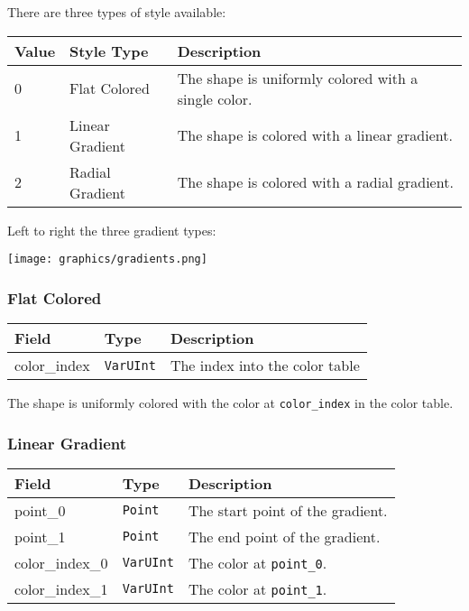 \documentclass[]{article}
\begin{document}
There are three types of style available:

\begin{longtable}[]{@{}p{0.5in}p{1in}p{4.5in}@{}}
\toprule
Value & Style Type & Description \\
\midrule
\endhead
0 & Flat Colored & The shape is uniformly colored with a single
color. \\
1 & Linear Gradient & The shape is colored with a linear gradient. \\
2 & Radial Gradient & The shape is colored with a radial gradient. \\
\bottomrule
\end{longtable}

Left to right the three gradient types:

\begin{center}
\texttt{[image: graphics/gradients.png]}
\end{center}

\hypertarget{flat-colored}{\subsubsection{Flat Colored}\label{flat-colored}}

\begin{longtable}[]{@{}p{1in}p{1in}p{4in}@{}}
\toprule
Field & Type & Description \\
\midrule
\endhead
color\_index & \texttt{VarUInt} & The index into the color table \\
\bottomrule
\end{longtable}

The shape is uniformly colored with the color at \texttt{color\_index}
in the color table.

\hypertarget{linear-gradient}{\subsubsection{Linear Gradient}\label{linear-gradient}}

\begin{longtable}[]{@{}p{1in}p{1in}p{4in}@{}}
\toprule
Field & Type & Description \\
\midrule
\endhead
point\_0        & \texttt{Point}   & The start point of the gradient. \\
point\_1        & \texttt{Point}   & The end point of the gradient. \\
color\_index\_0 & \texttt{VarUInt} & The color at \texttt{point\_0}. \\
color\_index\_1 & \texttt{VarUInt} & The color at \texttt{point\_1}. \\
\bottomrule
\end{longtable}
\end{document}
